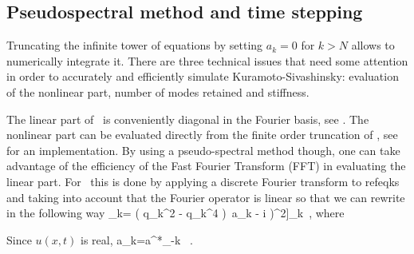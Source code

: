 \renewcommand{\inputfile}{\version\ - edited 2008-06-26 appeKSeDetails}

\subsection{Pseudospectral method and time stepping}

Truncating the infinite tower of equations  by setting $a_k=0$ for $k>N$
allows to numerically integrate it. There are three technical issues that need some attention
in order to accurately and efficiently simulate Kuramoto-Sivashinsky: evaluation of
the nonlinear part, number of modes retained and stiffness.

The linear part of \KSe\ is conveniently diagonal in the Fourier basis, see .
The nonlinear part can be evaluated directly from the finite order truncation of ,
see  for an implementation. By using a pseudo-spectral method though, one
can take advantage of the efficiency of the Fast Fourier Transform (FFT) in evaluating the
linear part. For \KSe\ this is done by  applying a discrete Fourier transform to refeq{ks} and
taking into account that the Fourier operator is linear so that we can rewrite  
in the following way
\beq
{}_k= ( q_k^2 - q_k^4 )\, a_k
    - i  \left[\left(\mathcal{F}^{-1}\left[a\right]\right)^2\right]_k \,,
\eeq
where 


% 
 Since $u(x,t)$ is real,
 \beq
  a_{k}=a^*_{-k} \, .
  \label{eq:a*}
 \eeq


